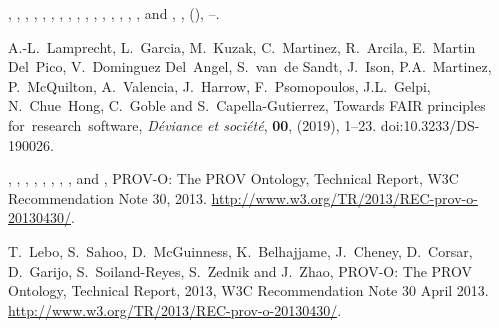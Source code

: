 \documentclass[ds,v1.1.2,openaccess]{iosart2x}%
\begin{document}
\begin{thebibliography}{}
%
\begin{barticle}
,
,
,
,
,
,
,
,
,
,
,
,
,
,
,
,
 and
,
,
(),
--.
\end{barticle}
%
\OrigBibText
A.-L.~Lamprecht,
L.~Garcia,
M.~Kuzak,
C.~Martinez,
R.~Arcila,
E.~Martin Del~Pico,
V.~Dominguez Del~Angel,
S.~van~de Sandt,
J.~Ison,
P.A.~Martinez,
P.~{McQuilton},
A.~Valencia,
J.~Harrow,
F.~Psomopoulos,
J.L.~Gelpi,
N.~Chue~Hong,
C.~Goble and
S.~Capella-Gutierrez,
Towards {FAIR} principles for~research~software,
\textit{D\'{e}viance et soci\'{e}t\'{e}}, \textbf{00},
(2019),
1--23.
doi:10.3233/DS-190026.
\endOrigBibText
{}
\endbibitem

%
\begin{botherref}
,
,
,
,
,
,
,
,
 and
,
PROV-O: The PROV Ontology,
Technical Report, W3C Recommendation Note 30,
2013.
\url{http://www.w3.org/TR/2013/REC-prov-o-20130430/}.
\end{botherref}
%
\OrigBibText
T.~Lebo,
S.~Sahoo,
D.~McGuinness,
K.~Belhajjame,
J.~Cheney,
D.~Corsar,
D.~Garijo,
S.~Soiland-Reyes,
S.~Zednik and
J.~Zhao,
PROV-O: The PROV Ontology,
Technical Report,
2013,
W3C Recommendation Note 30 April 2013.
\url{http://www.w3.org/TR/2013/REC-prov-o-20130430/}.
\endOrigBibText
{}
\endbibitem


\end{thebibliography}
\end{document}
